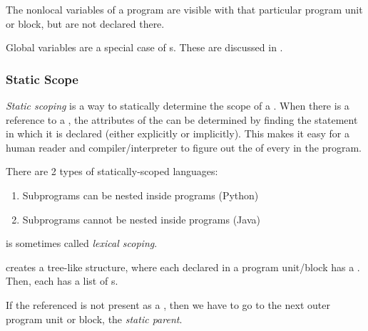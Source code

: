 \begin{definition}\label{def:Nonlocal_Variable}
  The nonlocal variables of a program are visible with that particular program unit or block, but are not declared there.

  \begin{remark}
    Global variables are a special case of s.
    These are discussed in .
  \end{remark}
\end{definition}

\subsubsection{Static Scope}\label{subsubsec:Variable_Static_Scope}
\begin{definition}\label{def:Variable_Static_Scoping}
  \emph{Static scoping} is a way to statically determine the scope of a .
  When there is a reference to a , the attributes of the  can be determined by finding the statement in which it is declared (either explicitly or implicitly).
  This makes it easy for a human reader and compiler/interpreter to figure out the  of every  in the program.

  There are 2 types of statically-scoped languages:
  \begin{enumerate}[noitemsep]
  \item Subprograms can be nested inside programs (Python)
  \item Subprograms cannot be nested inside programs (Java)
  \end{enumerate}

  \begin{remark}\label{rmk:Variable_Lexical_Scoping}
     is sometimes called \emph{lexical scoping}.
  \end{remark}
\end{definition}

 creates a tree-like structure, where each  declared in a program unit/block has a .
Then, each  has a list of s.

\begin{definition}\label{def:Variable_Static_Parent}
  If the  referenced is not present as a , then we have to go to the next outer program unit or block, the \emph{static parent}.
\end{definition}

